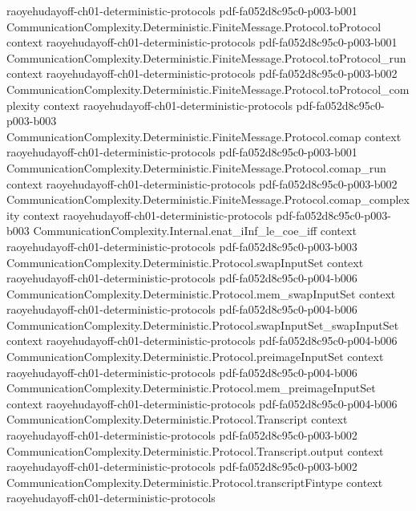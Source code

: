 \begin{theorem}
  {raoyehudayoff-ch01-deterministic-protocols}
  {pdf-fa052d8c95c0-p003-b001}
\proofstep
  {CommunicationComplexity.Deterministic.FiniteMessage.Protocol.toProtocol}
  {context}
  {raoyehudayoff-ch01-deterministic-protocols}
  {pdf-fa052d8c95c0-p003-b001}
\proofstep
  {CommunicationComplexity.Deterministic.FiniteMessage.Protocol.toProtocol_run}
  {context}
  {raoyehudayoff-ch01-deterministic-protocols}
  {pdf-fa052d8c95c0-p003-b002}
\proofstep
  {CommunicationComplexity.Deterministic.FiniteMessage.Protocol.toProtocol_complexity}
  {context}
  {raoyehudayoff-ch01-deterministic-protocols}
  {pdf-fa052d8c95c0-p003-b003}
\proofstep
  {CommunicationComplexity.Deterministic.FiniteMessage.Protocol.comap}
  {context}
  {raoyehudayoff-ch01-deterministic-protocols}
  {pdf-fa052d8c95c0-p003-b001}
\proofstep
  {CommunicationComplexity.Deterministic.FiniteMessage.Protocol.comap_run}
  {context}
  {raoyehudayoff-ch01-deterministic-protocols}
  {pdf-fa052d8c95c0-p003-b002}
\proofstep
  {CommunicationComplexity.Deterministic.FiniteMessage.Protocol.comap_complexity}
  {context}
  {raoyehudayoff-ch01-deterministic-protocols}
  {pdf-fa052d8c95c0-p003-b003}
\proofstep
  {CommunicationComplexity.Internal.enat_iInf_le_coe_iff}
  {context}
  {raoyehudayoff-ch01-deterministic-protocols}
  {pdf-fa052d8c95c0-p003-b003}
\proofstep
  {CommunicationComplexity.Deterministic.Protocol.swapInputSet}
  {context}
  {raoyehudayoff-ch01-deterministic-protocols}
  {pdf-fa052d8c95c0-p004-b006}
\proofstep
  {CommunicationComplexity.Deterministic.Protocol.mem_swapInputSet}
  {context}
  {raoyehudayoff-ch01-deterministic-protocols}
  {pdf-fa052d8c95c0-p004-b006}
\proofstep
  {CommunicationComplexity.Deterministic.Protocol.swapInputSet_swapInputSet}
  {context}
  {raoyehudayoff-ch01-deterministic-protocols}
  {pdf-fa052d8c95c0-p004-b006}
\proofstep
  {CommunicationComplexity.Deterministic.Protocol.preimageInputSet}
  {context}
  {raoyehudayoff-ch01-deterministic-protocols}
  {pdf-fa052d8c95c0-p004-b006}
\proofstep
  {CommunicationComplexity.Deterministic.Protocol.mem_preimageInputSet}
  {context}
  {raoyehudayoff-ch01-deterministic-protocols}
  {pdf-fa052d8c95c0-p004-b006}
\proofstep
  {CommunicationComplexity.Deterministic.Protocol.Transcript}
  {context}
  {raoyehudayoff-ch01-deterministic-protocols}
  {pdf-fa052d8c95c0-p003-b002}
\proofstep
  {CommunicationComplexity.Deterministic.Protocol.Transcript.output}
  {context}
  {raoyehudayoff-ch01-deterministic-protocols}
  {pdf-fa052d8c95c0-p003-b002}
\proofstep
  {CommunicationComplexity.Deterministic.Protocol.transcriptFintype}
  {context}
  {raoyehudayoff-ch01-deterministic-protocols}

\end{theorem}

